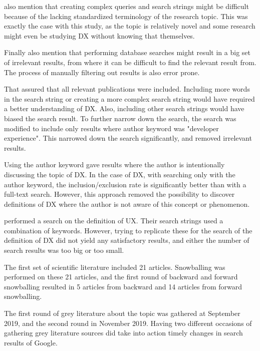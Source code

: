 \documentclass[english, 12pt, a4paper, sci, utf8, a-1b, online]{aaltothesis}
\newcounter{subsubsubsection}[subsubsection]
\begin{document}
\cite{guidelines-for-snowballing} also mention that creating complex queries and search strings might be difficult because of the lacking standardized terminology of the research topic. This was exactly the case with this study, as the topic is relatively novel and some research might even be studying DX without knowing that themselves.

Finally \cite{guidelines-for-snowballing} also mention that performing database searches might result in a big set of irrelevant results, from where it can be difficult to find the relevant result from. The process of manually filtering out results is also error prone.

That assured that all relevant publications were included. Including more words in the search string or creating a more complex search string would have required a better understanding of DX. Also, including other search strings would have biased the search result. To further narrow down the search, the search was modified to include only results where author keyword was "developer experience". This narrowed down the search significantly, and removed irrelevant results.

Using the author keyword gave results where the author is intentionally discussing the topic of DX. In the case of DX, with searching only with the author keyword, the inclusion/exclusion rate is significantly better than with a full-text search. However, this approach removed the possibility to discover definitions of DX where the author is not aware of this concept or phenomenon.

\cite{understanding-ux} performed a search on the definition of UX. Their search strings used a combination of keywords. However, trying to replicate these for the search of the definition of DX did not yield any satisfactory results, and either the number of search results was too big or too small.


The first set of scientific literature included 21 articles. Snowballing was performed on these 21 articles, and the first round of backward and forward snowballing resulted in 5 articles from backward and 14 articles from forward snowballing.

The first round of grey literature about the topic was gathered at September 2019, and the second round in November 2019. Having two different occasions of gathering grey literature sources did take into action timely changes in search results of Google.
\end{document}
